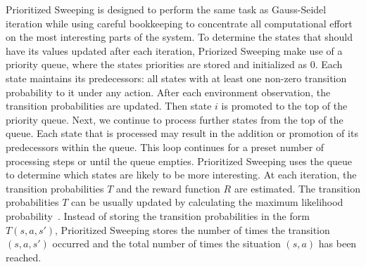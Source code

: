 Prioritized Sweeping is designed to perform the same task as Gauss-Seidel iteration while using careful bookkeeping to concentrate all computational effort on the most interesting parts of the system.
To determine the states that should have its values updated after each iteration, Priorized Sweeping make use of a priority queue, where the states priorities are stored and initialized as 0.
Each state maintains its predecessors: all states with at least one non-zero transition probability to it under any action.
After each environment observation, the transition probabilities are updated.
Then state $i$ is promoted to the top of the priority queue. 
Next, we continue to process further states from the top of the queue. 
Each state that is processed may result in the addition or promotion of its predecessors within the queue. 
This loop continues for a preset number of processing steps or until the queue empties.
Prioritized Sweeping uses the queue to determine which states are likely to be more interesting.
At each iteration, the transition probabilities $T$ and the reward function $R$ are estimated.
The transition probabilities $T$ can be usually updated by calculating the maximum likelihood probability~\cite{de2006reinforcement}.
Instead of storing the transition probabilities in the form $T(s,a,s')$, Prioritized Sweeping stores the number of times the transition $(s,a,s')$ occurred and the total number of times the situation $(s,a)$ has been reached.

